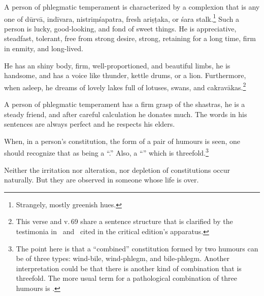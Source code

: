 \begin{translation}
 \item[72]
 
 A person of phlegmatic temperament is characterized by a complexion that is any one of \gls{dūrvā}, \gls{indīvara}, \gls{nistriṃśapatra}, 
 fresh \gls{ariṣṭaka}, or \gls{śara} stalk.\footnote{Strangely, mostly greenish hues.}  Such a person is  lucky, good-looking, and fond of sweet things.  He is appreciative, steadfast, tolerant, free from strong desire, strong, 
     retaining for a long time, firm in enmity, and long-lived.
 
 
 \item[73]
 
\begin{sloka}
    He has an shiny body, firm, well-proportioned, and beautiful limbs,
he is handsome, and has a voice like thunder, kettle drums, or a
lion. Furthermore, when asleep, he dreams of lovely lakes full of
lotuses, swans, and \glspl{cakravāka}.\footnote{This verse and v.\,69 
    share a sentence structure that is clarified by the testimonia in \AS\ and \Ah\ cited in the critical edition's apparatus.}
\end{sloka}

\item[75]
 
\begin{sloka}
     A person of phlegmatic temperament has a firm  grasp of the shastras,
he is a steady friend, and after careful calculation he donates much.
The words in his sentences are always perfect and he respects his
elders.
\end{sloka}

\item[77.add]

\begin{sloka}
    When, in a person’s constitution, the form of a pair of humours is
seen, one should recognize that as being a “.” Also, a “”
which is threefold.\footnote{The point here is that a “combined”
    constitution formed by two humours can be of three types:
    wind-bile, wind-phlegm, and bile-phlegm.  Another interpretation
    could be that there is another kind of combination that is
    threefold. The more usual term for a pathological combination of
    three humours is .}
\end{sloka}

\item[78]

\begin{sloka}
    Neither the irritation nor alteration, nor depletion of constitutions
occur naturally.  But they are observed in someone whose life is over.
\end{sloka}


\end{translation}
